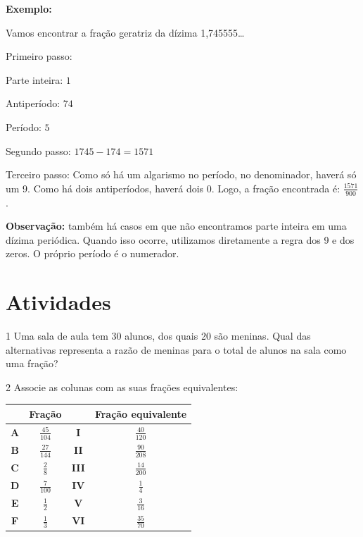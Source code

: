 \textbf{Exemplo:}

Vamos encontrar a fração geratriz da dízima 1,745555\ldots{}

Primeiro passo:

Parte inteira: $1$

Antiperíodo: $74$

Período: $5$

Segundo passo: $1745 - 174 = 1571$

Terceiro passo: Como só há um algarismo no período, no denominador,
haverá só um 9. Como há dois antiperíodos, haverá dois 0. Logo, a fração
encontrada é: $\frac{1571}{900}$.

\textbf{Observação:} também há casos em que não encontramos parte
inteira em uma dízima periódica. Quando isso ocorre, utilizamos
diretamente a regra dos 9 e dos zeros. O próprio período é o numerador.

\section{Atividades}

\num{1} Uma sala de aula tem 30 alunos, dos quais 20 são meninas. Qual das
alternativas representa a razão de meninas para o total de alunos na
sala como uma fração?


\num{2} Associe as colunas com as suas frações equivalentes:

\begin{table}[]
\begin{tabular}{c|c|c|c|}
\cline{2-2} \cline{4-4}
 & \textbf{Fração} & \textbf{} & \textbf{Fração equivalente} \\ \hline
\multicolumn{1}{|c|}{\textbf{A}} & $\frac{45}{104}$ & \textbf{I} & $\frac{40}{120}$ \\ \hline
\multicolumn{1}{|c|}{\textbf{B}} & $\frac{27}{144}$ & \textbf{II} & $\frac{90}{208}$ \\ \hline
\multicolumn{1}{|c|}{\textbf{C}} & $\frac{2}{8}$ & \textbf{III} & $\frac{14}{200}$ \\ \hline
\multicolumn{1}{|c|}{\textbf{D}} & $\frac{7}{100}$ & \textbf{IV} & $\frac{1}{4}$ \\ \hline
\multicolumn{1}{|c|}{\textbf{E}} & $\frac{1}{2}$ & \textbf{V} & $\frac{3}{16}$ \\ \hline
\multicolumn{1}{|c|}{\textbf{F}} & $\frac{1}{3}$ & \textbf{VI} & $\frac{35}{70}$ \\ \hline
\end{tabular}
\end{table}

